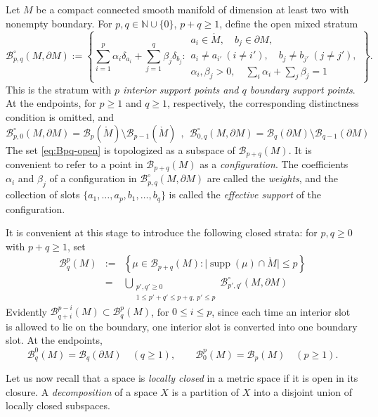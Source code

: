 \documentclass[11pt,a4paper]{article}
\numberwithin{equation}{section}
\theoremstyle{definition}
\theoremstyle{remark}
\newcommand{\N}{\mathbb{N}}
\newcommand{\pa}{\partial}
\newcommand{\supp}{\operatorname{supp}}
\newcommand{\BB}{\mathcal B}
\begin{document}
Let \(M\) be a compact connected smooth manifold of dimension at least two with nonempty boundary.  For \(p,q\in\N\cup\{0\}\), \(p+q\ge1\), define the open mixed stratum
\begin{equation}\label{eq:Bpq-open}
\BB_{p,q}^{\circ}(M,\pa M):=
\left\{
\sum_{i=1}^{p}\alpha_i\delta_{a_i}
+
\sum_{j=1}^{q}\beta_j\delta_{b_j}:
\begin{array}{l}
 a_i\in\mathring M,
 \quad b_j\in\pa M,\\
 a_i\ne a_{i'}\ (i\ne i'),
 \quad b_j\ne b_{j'}\ (j\ne j'),\\
 \alpha_i,\beta_j>0,
 \quad \sum_i\alpha_i+\sum_j\beta_j=1
\end{array}
\right\}.
\end{equation}
This is the stratum with \textit{$p$ interior support points and $q$ boundary support points}.
At the endpoints, for \(p\ge1\) and \(q\ge1\), respectively, the corresponding distinctness condition is omitted, and
$$\BB_{p,0}^\circ (M,\partial M) = \BB_p(\mathring{M})\setminus \BB_{p-1}(\mathring M)\ \ ,\ \ \BB_{0,q}^\circ (M,\partial M) = \BB_q(\partial M)\setminus \BB_{q-1}(\partial M)$$
The set \eqref{eq:Bpq-open} is topologized as a subspace of $\BB_{p+q}(M)$. It is convenient to refer to a point in $\BB_{p+q}(M)$ as a \textit{configuration}. The coefficients $\alpha_i$ and $\beta_j$ of a configuration in $\BB_{p,q}^\circ (M,\pa M)$ are called the \textit{weights}, and the collection of slots $\{a_1,\ldots, a_p,b_1,\ldots, b_q\}$ is called the \textit{effective support} of the configuration.

It is convenient at this stage to introduce the following closed strata: for \(p,q\ge0\) with \(p+q\ge1\), set
\begin{eqnarray}\label{eq:closed-strata}
\BB_q^p(M)&:=&
\left\{
\mu\in \BB_{p+q}(M):
\bigl|\supp(\mu)\cap\mathring M\bigr|\le p
\right\}\\
&=&\bigcup_{\substack{p',q'\ge0\\1\le p'+q'\le p+q,\ p'\leq p}} \BB_{p',q'}^{\circ}(M,\pa M)\nonumber
\end{eqnarray}
Evidently $
\BB_{q+i}^{p-i}(M)\subset \BB_q^p(M)$, for $0\le i\le p$, since each time an interior slot is allowed to lie on the boundary, one interior slot is converted into one boundary slot. At the endpoints,
$$\BB_q^0(M) = \BB_q(\pa M)\quad(q\ge1),
\qquad
\BB_0^p(M) = \BB_p(M)\quad(p\ge1).$$

Let us now recall that a space is \textit{locally closed} in a metric space if it is open in its closure. A \textit{decomposition} of a space $X$ is a partition of $X$ into a disjoint union of locally closed subspaces.
\end{document}
